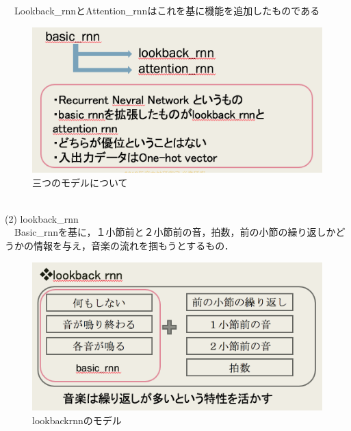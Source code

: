 　Lookback\_rnnとAttention\_rnnはこれを基に機能を追加したものである
\begin{figure}[!ht]
    \begin{screen}
    \begin{center}
        \includegraphics[scale=0.8, clip]{./img/basic1.png}
        \caption{三つのモデルについて}
        \label{fig:MelodyRNNについて}
    \end{center}
    \end{screen}
\end{figure}\\
\newpage
(2) lookback\_rnn\\
　Basic\_rnnを基に，１小節前と２小節前の音，拍数，前の小節の繰り返しかどうかの情報を与え，音楽の流れを掴もうとするもの．\\
\begin{figure}[!ht]
    \begin{screen}
    \begin{center}
        \includegraphics[scale=0.8, clip]{./img/lookback1.png}
        \caption{lookbackrnnのモデル}
        \label{fig:lookbackrnnのモデル}
    \end{center}
    \end{screen}
\end{figure}\\
